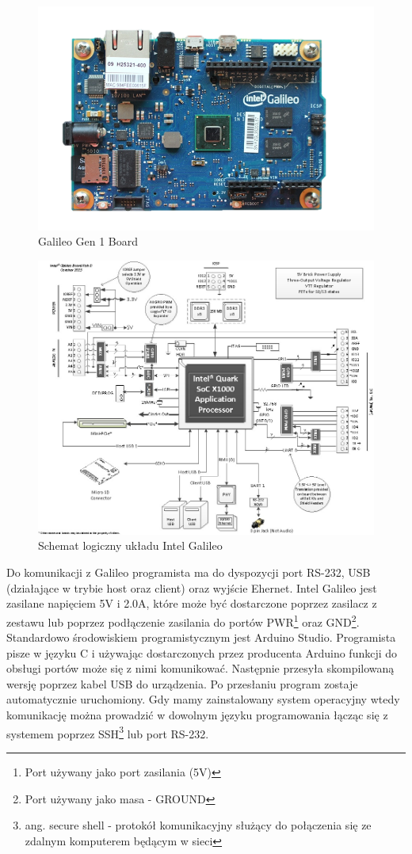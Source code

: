 \documentclass{xmgr}
\begin{document}
\begin{figure}[!h]
    \centering
    \includegraphics[height=0.4\textwidth]{images/galileo.png}
    \caption{Galileo Gen 1 Board \label{Galileo Gen 1 Board}}
\end{figure}

\begin{figure}[!h]
    \centering
    \includegraphics[height=0.6\textwidth]{images/IntelGalileoLogicSchematics.jpg}
    \caption{Schemat logiczny układu Intel Galileo\label{IntelGalileoLogicSchematics}}
\end{figure}

Do komunikacji z Galileo programista ma do dyspozycji port RS-232, USB (działające w trybie host oraz client) oraz wyjście Ehernet. Intel Galileo jest zasilane napięciem 5V i 2.0A, które może być dostarczone poprzez zasilacz z zestawu lub poprzez podłączenie zasilania do portów PWR\footnote{Port używany jako port zasilania (5V)} oraz GND\footnote{Port używany jako masa - GROUND}. Standardowo środowiskiem programistycznym jest Arduino Studio. Programista pisze w języku C i używając dostarczonych przez producenta Arduino funkcji do obsługi portów może się z nimi komunikować. Następnie przesyła skompilowaną wersję poprzez kabel USB do urządzenia. Po przesłaniu program zostaje automatycznie uruchomiony. Gdy mamy zainstalowany system operacyjny wtedy komunikację można prowadzić w dowolnym języku programowania łącząc się z systemem poprzez SSH\footnote{ang. secure shell - protokół komunikacyjny służący do połączenia się ze zdalnym komputerem będącym w sieci} lub port RS-232.
\end{document}
